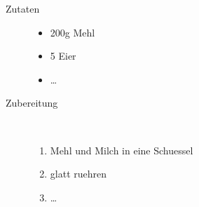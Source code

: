 \begin{description}
  \item[Zutaten] \begin{itemize}
      \item 200g Mehl
      \item 5 Eier
      \item \ldots
    \end{itemize}
  \item[Zubereitung]\hfill\\ \begin{enumerate}
      \item Mehl und Milch in eine Schuessel
      \item glatt ruehren
      \item \ldots
    \end{enumerate}
\end{description}

